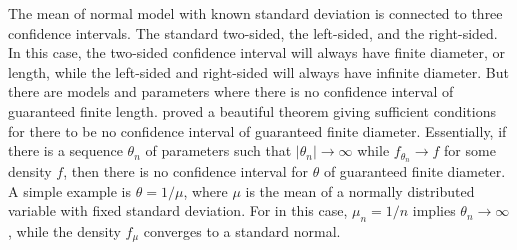 The mean of normal model with known standard deviation is connected to three confidence intervals. The standard two-sided, the left-sided, and the right-sided. In this case, the two-sided confidence interval will always have finite diameter, or length, while the left-sided and right-sided will always have infinite diameter. But there are models and parameters where there is no confidence interval of guaranteed finite length. \textcite{Gleser1987-ii} proved a beautiful theorem giving sufficient conditions for there to be no confidence interval of guaranteed finite diameter. Essentially, if there is a sequence $\theta_n$ of parameters such that $|\theta_n| \to \infty$ while $f_{\theta_n} \to f$ for some density $f$, then there is no confidence interval for $\theta$ of guaranteed finite diameter. A simple example is $\theta = 1/\mu$, where $\mu$ is the mean of a normally distributed variable with fixed standard deviation. For in this case, $\mu_n = 1/n$ implies $\theta_n\to\infty$, while the density $f_\mu$ converges to a standard normal.